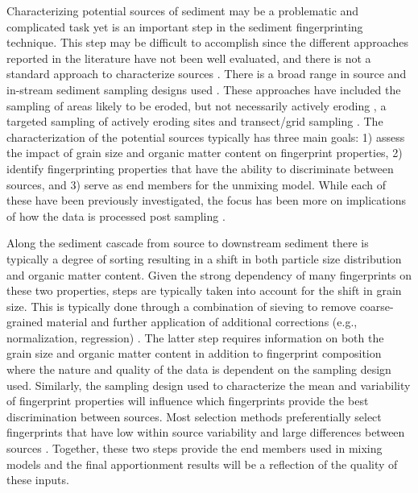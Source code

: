\documentclass[
  number]{elsarticle}
\begin{document}
Characterizing potential sources of sediment may be a problematic and
complicated task yet is an important step in the sediment fingerprinting
technique. This step may be difficult to accomplish since the different
approaches reported in the literature have not been well evaluated, and
there is not a standard approach to characterize sources
\citep{collins2020}. There is a broad range in source and in-stream
sediment sampling designs used \citep[e.g.,][]{boudreault2019}. These
approaches have included the sampling of areas likely to be eroded, but
not necessarily actively eroding \citep{collins1997}, a targeted
sampling of actively eroding sites \citep{wallbrink2004} and
transect/grid sampling \citep{miller2005}. The characterization of the
potential sources typically has three main goals: 1) assess the impact
of grain size and organic matter content on fingerprint properties, 2)
identify fingerprinting properties that have the ability to discriminate
between sources, and 3) serve as end members for the unmixing model.
While each of these have been previously investigated, the focus has
been more on implications of how the data is processed post sampling
\citep[e.g.,][]{haddadchi2014, smith2014, laceby2015, laceby2017, batista2022}.

Along the sediment cascade from source to downstream sediment there is
typically a degree of sorting resulting in a shift in both particle size
distribution and organic matter content. Given the strong dependency of
many fingerprints on these two properties, steps are typically taken
into account for the shift in grain size. This is typically done through
a combination of sieving to remove coarse-grained material and further
application of additional corrections (e.g., normalization, regression)
\citep{laceby2017}. The latter step requires information on both the
grain size and organic matter content in addition to fingerprint
composition where the nature and quality of the data is dependent on the
sampling design used. Similarly, the sampling design used to
characterize the mean and variability of fingerprint properties will
influence which fingerprints provide the best discrimination between
sources. Most selection methods preferentially select fingerprints that
have low within source variability and large differences between sources
\citep{pulley2017}. Together, these two steps provide the end members
used in mixing models and the final apportionment results will be a
reflection of the quality of these inputs.
\end{document}

